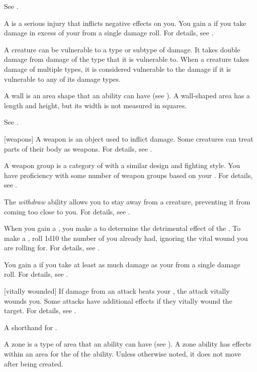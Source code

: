  See .

 A  is a serious injury that inflicts negative effects on you.
You gain a  if you take damage in excess of your  from a single damage roll.
For details, see .

 A creature can be vulnerable to a type or subtype of damage.
It takes double damage from damage of the type that it is vulnerable to.
When a creature takes damage of multiple types, it is considered vulnerable to the damage if it is vulnerable to any of its damage types.

 A wall is an area shape that an ability can have (see ).
A wall-shaped area has a length and height, but its width is not measured in squares.

 See .

[weapons] A weapon is an object used to inflict damage.
Some creatures can treat parts of their body as weapons.
For details, see .

 A weapon group is a category of  with a similar design and fighting style.
You have proficiency with some number of weapon groups based on your .
For details, see .

 The \textit{withdraw} ability allows you to stay away from a creature, preventing it from coming too close to you.
For details, see .

 When you gain a , you make a  to determine the detrimental effect of the .
To make a , roll 1d10 \sub the number of  you already had, ignoring the vital wound you are rolling for.
For details, see .

 You gain a  if you take at least as much damage as your  from a single damage roll.
For details, see .

[vitally wounded] If damage from an attack beats your , the attack vitally wounds you.
Some attacks have additional effects if they vitally wound the target.
For details, see .

 A shorthand for .

 A zone is a type of area that an ability can have (see ).
A zone ability has effects within an area for the  of the ability.
Unless otherwise noted, it does not move after being created.
